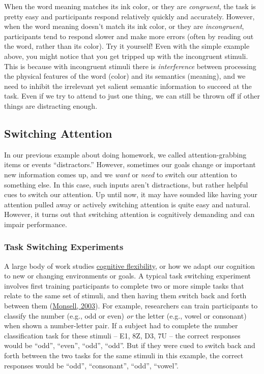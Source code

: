 \documentclass[
]{krantz}
\begin{document}
When the word meaning matches its ink color, or they are \emph{congruent}, the task is pretty easy and participants respond relatively quickly and accurately. However, when the word meaning doesn't match its ink color, or they are \emph{incongruent}, participants tend to respond slower and make more errors (often by reading out the word, rather than its color). Try it yourself! Even with the simple example above, you might notice that you get tripped up with the incongruent stimuli. This is because with incongruent stimuli there is \emph{interference} between processing the physical features of the word (color) and its semantics (meaning), and we need to inhibit the irrelevant yet salient semantic information to succeed at the task. Even if we try to attend to just one thing, we can still be thrown off if other things are distracting enough.

\hypertarget{switching-attention}{%
\subsection*{Switching Attention}\label{switching-attention}}


In our previous example about doing homework, we called attention-grabbing items or events ``distractors.'' However, sometimes our goals change or important new information comes up, and we \emph{want} or \emph{need} to switch our attention to something else. In this case, such inputs aren't distractions, but rather helpful cues to switch our attention. Up until now, it may have sounded like having your attention pulled away or actively switching attention is quite easy and natural. However, it turns out that switching attention is cognitively demanding and can impair performance.

\hypertarget{task-switching-experiments}{%
\subsubsection*{Task Switching Experiments}\label{task-switching-experiments}}


A large body of work studies \protect\hyperlink{cognitive-flexibility}{cognitive flexibility}, or how we adapt our cognition to new or changing environments or goals. A typical task switching experiment involves first training participants to complete two or more simple tasks that relate to the same set of stimuli, and then having them switch back and forth between them (\protect\hyperlink{ref-Monsell2003}{Monsell, 2003}). For example, researchers can train participants to classify the number (e.g., odd or even) \emph{or} the letter (e.g., vowel or consonant) when shown a number-letter pair. If a subject had to complete the number classification task for these stimuli -- E1, 8Z, D3, 7U -- the correct responses would be ``odd'', ``even'', ``odd'', ``odd''. But if they were cued to switch back and forth between the two tasks for the same stimuli in this example, the correct responses would be ``odd'', ``consonant'', ``odd'', ``vowel''.
\end{document}
